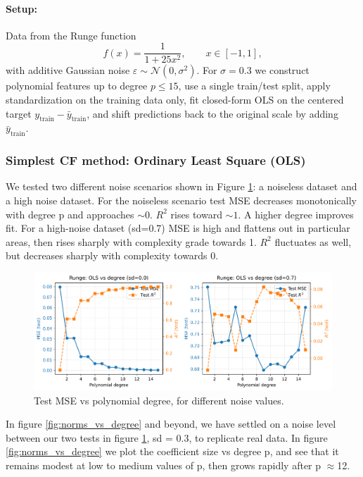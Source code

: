 \documentclass[amssymb,twocolumn,aps,floatfix]{revtex4-2}
\begin{document}
\paragraph{Setup:}
Data from the Runge function
\[
f(x)=\frac{1}{1+25x^{2}}, \qquad x\in[-1,1],
\]
with additive Gaussian noise \(\varepsilon\sim\mathcal N(0,\sigma^{2})\).
For $\sigma = 0.3$  we construct polynomial features up to
degree \(p\le 15\), use a single train/test split, apply standardization
on the training data only, fit closed-form OLS on the centered target
\(y_{\text{train}}-\bar y_{\text{train}}\), and shift predictions back to the
original scale by adding \(\bar y_{\text{train}}\).

\subsubsection{Simplest CF method: Ordinary Least Square (OLS)}

We tested two different noise scenarios shown in Figure \ref{fig:ols_vs_degree}: a noiseless dataset and a high noise dataset. For the noiseless scenario test MSE decreases monotonically with degree p and approaches $\sim 0$. $R^2$ rises toward $\sim 1$. A higher degree improves fit. For a high-noise dataset (sd=0.7) MSE is high and flattens out in particular areas, then rises sharply with complexity grade towards 1. $R^2$ fluctuates as well, but decreases sharply with complexity towards 0. 

\begin{figure}[t]
    \centering
    \includegraphics[width=1\linewidth]{Project-1/Figures/runge_ols_mse_r2_vs_degree.png}
    \caption{Test MSE vs polynomial degree, for different noise values.}
    \label{fig:ols_vs_degree}
\end{figure}

In figure \ref{fig:norms_vs_degree} and beyond, we have settled on a noise level between our two tests in figure \ref{fig:ols_vs_degree}, sd = 0.3, to replicate real data. In figure \ref{fig:norms_vs_degree} we plot the coefficient size vs degree p, and see that it remains modest at low to medium values of p, then grows rapidly after p $\approx$12. 
\end{document}
